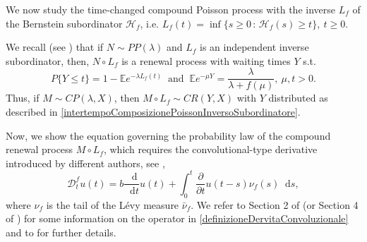 \documentclass[12pt, twoside, english, headsepline]{article}
\newcommand*\dif{\mathop{}\!\mathrm{d}}  %
\theoremstyle{definition} %
\numberwithin{equation}{section} %
\begin{document}
We now study the time-changed compound Poisson process with the inverse $L_f$ of the Bernstein subordinator $\mathcal{H}_f$, i.e. $L_f(t)=\inf\{s\ge0\,:\, \mathcal{H}_f(s)\ge t\},\ t\ge0$.

We recall (see \cite{K2011}) that if $N\sim PP(\lambda)$ and $L_f$ is an independent inverse subordinator, then, $N\circ L_f$ is a renewal process with waiting times $Y$ s.t. 
	\begin{equation}\label{intertempoComposizionePoissonInversoSubordinatore}
		P\{Y\le t\} =  1-\mathbb{E}e^{-\lambda L_f(t)}\ \text{ and } \ \mathbb{E}e^{-\mu Y} = \frac{\lambda}{\lambda+f(\mu)},\ \mu, t>0.
	\end{equation}
Thus, if $M\sim CP(\lambda, X)$, then $M\circ L_f\sim CR(Y, X)$ with $Y$ distributed as described in \eqref{intertempoComposizionePoissonInversoSubordinatore}.



Now, we show the equation governing the probability law of the compound renewal process $M\circ L_f$, which requires the convolutional-type derivative introduced by different authors, see \cite{K2011, T2015}, 
\begin{equation}\label{definizioneDervitaConvoluzionale}
	\mathcal{D}_t^f u(t) = b\frac{\dif }{\dif t}u(t) + \int_0^t \frac{\partial }{\partial t}u(t-s)\nu_f(s)\dif s,
\end{equation}
where $\nu_f$ is the tail of the L\'{e}vy measure $\bar \nu_f$. We refer to Section 2 of \cite{BS2024} (or Section 4 of \cite{CO2026}) for some information on the operator in \eqref{definizioneDervitaConvoluzionale} and to \cite{K2011, T2015} for further details.
\\
\end{document}
